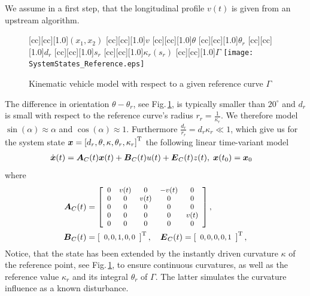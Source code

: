 We assume in a first step, that the longitudinal profile $v(t)$ is given from an upstream algorithm. 
\begin{figure}[t]
  [cc][cc][1.0]{$\left(x_1, x_2\right)$}
	[cc][cc][1.0]{$v$}
	[cc][cc][1.0]{$\theta$}
	[cc][cc][1.0]{$\theta_r$}
	[cc][cc][1.0]{$d_r$}
	[cc][cc][1.0]{$s_r$}
	[cc][cc][1.0]{$\kappa_r(s_r)$}
	[cc][cc][1.0]{$\Gamma$}
    \centering
    \texttt{[image: SystemStates\_Reference.eps]}
    \caption{Kinematic vehicle model with respect to a given reference curve $\Gamma$}
    \label{fig:SystemStates}
\end{figure}
The difference in orientation $\theta-\theta_r$, see Fig.\,\ref{fig:SystemStates}, is typically smaller than $20^\circ$ \cite{turri2013linear} and $d_r$ is small with respect to the reference curve's radius $r_r = \tfrac{1}{\kappa_r}$. We therefore model $\sin(\alpha)\approx \alpha$ and $\cos(\alpha)\approx 1$. Furthermore $\tfrac{d_r}{r_r} = d_r \kappa_r \ll 1$, which give us for the system state $\boldsymbol{x} = \left[d_r, \theta, \kappa, \theta_r, \kappa_r\right]^{\text{T}}$ the following linear time-variant model
\begin{align}
	\dot{\vektor x}(t) &= \mat A_C(t) \vektor x(t) + \mat B_C(t) u(t) + \mat E_C(t) z(t), \; \vektor x(t_0) = \vektor x_0
	\label{equ:LinSysModel}
\end{align}
where
\begin{align*}
	\mat A_C(t) &= \small \mtrx{ccccc}{0 & v(t) & 0 & -v(t) & 0 \\ 0 & 0 & v(t) & 0 & 0\\ 0 & 0 & 0 & 0 & 0 \\ 0 & 0 & 0 & 0 & v(t) \\ 0 & 0 & 0 & 0 & 0},\normalsize\\
	\mat B_C(t) &= \small \mtrx{c}{0, 0, 1, 0, 0}^{\text{T}} \normalsize, \quad \mat E_C(t) = \small \mtrx{c}{0, 0, 0, 0, 1}^{\text{T}},
\end{align*}
Notice, that the state has been extended by the instantly driven curvature $\kappa$ of the reference point, see Fig.\,\ref{fig:SystemStates}, to ensure continuous curvatures, as well as the reference value $\kappa_r$ and its integral $\theta_r$ of $\Gamma$. The latter simulates the curvature influence as a known disturbance.

